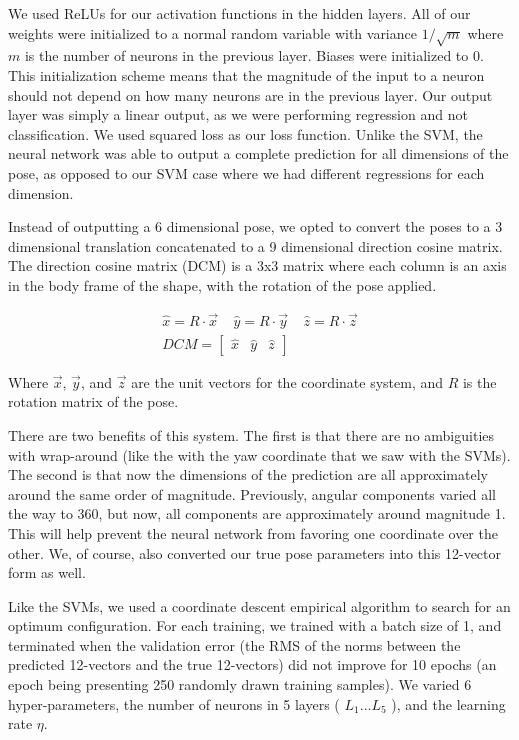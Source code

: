\documentclass[journal]{IEEEtran}
\begin{document}
We used ReLUs for our activation functions in the hidden layers. All of our weights were initialized to a normal random variable with variance $1/\sqrt{m}$ where $m$ is the number of neurons in the previous layer. Biases were initialized to 0. This initialization scheme means that the magnitude of the input to a neuron should not depend on how many neurons are in the previous layer. Our output layer was simply a linear output, as we were performing regression and not classification. We used squared loss as our loss function. Unlike the SVM, the neural network was able to output a complete prediction for all dimensions of the pose, as opposed to our SVM case where we had different regressions for each dimension.

Instead of outputting a 6 dimensional pose, we opted to convert the poses to a 3 dimensional translation concatenated to a 9 dimensional direction cosine matrix. The direction cosine matrix (DCM) is a 3x3 matrix where each column is an axis in the body frame of the shape, with the rotation of the pose applied.

\begin{gather}
\nonumber \hat x = R \cdot \vec x \; \; \; \; \hat y = R \cdot \vec y \; \; \; \; \hat z = R \cdot \vec z\\
DCM =
\begin{bmatrix}
\hat x & \hat y & \hat z
\end{bmatrix}
\end{gather} 

\noindent Where $\vec x$, $\vec y$, and $\vec z$ are the unit vectors for the coordinate system, and $R$ is the rotation matrix of the pose.

There are two benefits of this system. The first is that there are no ambiguities with wrap-around (like the with the yaw coordinate that we saw with the SVMs). The second is that now the dimensions of the prediction are all approximately around the same order of magnitude. Previously, angular components varied all the way to 360, but now, all components are approximately around magnitude 1. This will help prevent the neural network from favoring one coordinate over the other. We, of course, also converted our true pose parameters into this 12-vector form as well.

Like the SVMs, we used a coordinate descent empirical algorithm to search for an optimum configuration. For each training, we trained with a batch size of 1, and terminated when the validation error (the RMS of the norms between the predicted 12-vectors and the true 12-vectors) did not improve for 10 epochs (an epoch being presenting 250 randomly drawn training samples). We varied 6 hyper-parameters, the number of neurons in 5 layers ( $L_1 \dots L_5$ ), and the learning rate $\eta$.
\end{document}
